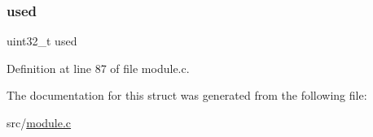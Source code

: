 \subsubsection{\texorpdfstring{used}{used}}
{\footnotesize\ttfamily uint32\+\_\+t used}



Definition at line 87 of file module.\+c.



The documentation for this struct was generated from the following file\+:\begin{DoxyCompactItemize}
\item 
src/\hyperlink{module_8c}{module.\+c}\end{DoxyCompactItemize}
